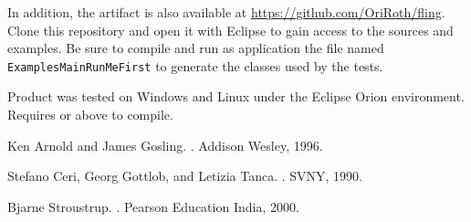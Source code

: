 \documentclass[a4paper,UKenglish,cleveref, autoref]{darts-v2019}
\begin{document}
\begin{getting}
	In addition, the artifact is also available at \url{https://github.com/OriRoth/fling}.
  Clone this repository and open it with Eclipse to gain access to the sources
  and examples.
  Be sure to compile and run as \Java application the file named \texttt{ExamplesMainRunMeFirst}
  to generate the classes used by the tests.
\end{getting}

\begin{platforms}
  Product was tested on Windows and Linux under the Eclipse Orion environment.
  Requires  or above to compile.
\end{platforms}




\appendix

\begin{thebibliography}{1}

Ken Arnold and James Gosling.
.
\newblock Addison Wesley, 1996.

Stefano Ceri, Georg Gottlob, and Letizia Tanca.
.
\newblock SVNY, 1990.

Bjarne Stroustrup.
.
\newblock Pearson Education India, 2000.

\end{thebibliography}

\end{document}
